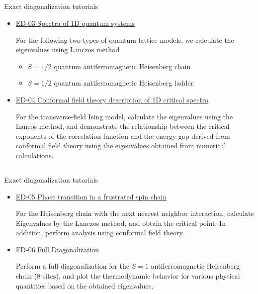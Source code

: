 \subsection*{\redm\whiteb\greenm}
\begin{frame}[t,fragile]{Exact diagonalization tutorials}
  \begin{itemize}
    \setlength{\itemsep}{1em}
  \item \href{http://alps.comp-phys.org/mediawiki/index.php/ALPS_2_Tutorials:ED-03_Spectra}{ED-03 Spectra of 1D quantum systems}

    For the following two types of quantum lattice models, we
    calculate the eigenvalues using Lanczos method
    \begin{itemize}
      \item $S=1/2$ quantum antiferromagnetic Heisenberg chain
      \item $S=1/2$ quantum antiferromagnetic Heisenberg ladder
    \end{itemize}

  \item \href{http://alps.comp-phys.org/mediawiki/index.php/ALPS_2_Tutorials:ED-04_Criticality}{ED-04 Conformal field theory description of 1D critical spectra}

    For the transverse-field Ising model, calculate the eigenvalues
    using the Lancos method, and demonstrate the relationship between
    the critical exponents of the correlation function and the energy
    gap derived from conformal field theory using the eigenvalues
    obtained from numerical calculations.
  \end{itemize}
\end{frame}

\subsection*{\redm\whiteb\greenm}
\begin{frame}[t,fragile]{Exact diagonalization tutorials}
  \begin{itemize}
    \setlength{\itemsep}{1em}
  \item \href{http://alps.comp-phys.org/mediawiki/index.php/ALPS_2_Tutorials:ED-05_ED_Phase_Transition}{ED-05 Phase transition in a frustrated spin chain}

    For the Heisenberg chain with the next nearest neighbor
    interaction, calculate Eigenvalues by the Lanczos method, and
    obtain the critical point. In addition, perform analysis using
    conformal field theory.

  \item \href{http://alps.comp-phys.org/mediawiki/index.php/ALPS_2_Tutorials:ED-06_FullDiagonalization}{ED-06 Full Diagonalization}

    Perform a full diagonalization for the $S=1$ antiferromagnetic
    Heisenberg chain (8 sites), and plot the thermodynamic behavior
    for various physical quantities based on the obtained eigenvalues.
  \end{itemize}
\end{frame}

